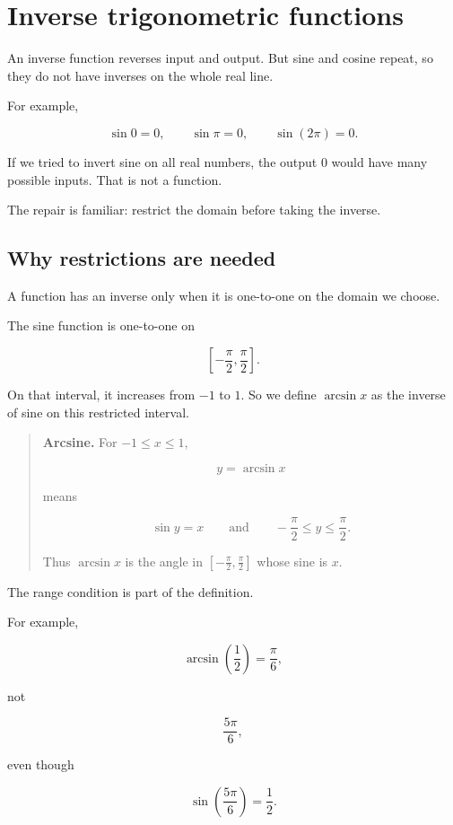 \section{Inverse trigonometric functions}
\label{appsec:inverse-trig-functions}

An inverse function reverses input and output.  But sine and cosine repeat, so they do
not have inverses on the whole real line.

For example,

\[
\sin 0=0,
\qquad
\sin \pi=0,
\qquad
\sin(2\pi)=0.
\]

If we tried to invert sine on all real numbers, the output \(0\) would have many possible
inputs.  That is not a function.

The repair is familiar: restrict the domain before taking the inverse.

\subsection{Why restrictions are needed}
\label{appsubsec:inverse-trig-restrictions-needed}

A function has an inverse only when it is one-to-one on the domain we choose.

The sine function is one-to-one on

\[
\left[-\frac{\pi}{2},\frac{\pi}{2}\right].
\]

On that interval, it increases from \(-1\) to \(1\).  So we define \(\arcsin x\) as the
inverse of sine on this restricted interval.

\begin{quote}
\textbf{Arcsine.}
For \(-1\le x\le1\),

\[
\boxed{
y=\arcsin x
}
\]

means

\[
\boxed{
\sin y=x
\qquad\text{and}\qquad
-\frac{\pi}{2}\le y\le\frac{\pi}{2}.
}
\]

Thus \(\arcsin x\) is the angle in \(\left[-\frac{\pi}{2},\frac{\pi}{2}\right]\) whose
sine is \(x\).
\end{quote}

The range condition is part of the definition.

For example,

\[
\arcsin\left(\frac12\right)=\frac{\pi}{6},
\]

not

\[
\frac{5\pi}{6},
\]

even though

\[
\sin\left(\frac{5\pi}{6}\right)=\frac12.
\]

